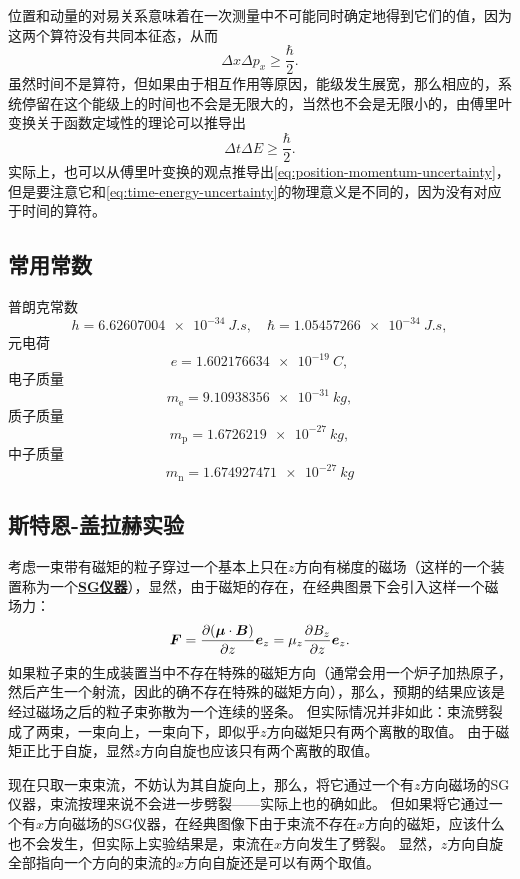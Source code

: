 \documentclass[UTF8, a4paper]{ctexart}
\newcommand*{\concept}[1]{\underline{\textbf{#1}}}
\begin{document}
位置和动量的对易关系意味着在一次测量中不可能同时确定地得到它们的值，因为这两个算符没有共同本征态，从而
\begin{equation}
    \Delta x \Delta p_x \geq \frac{\hbar}{2}.
    \label{eq:position-momentum-uncertainty}
\end{equation}
虽然时间不是算符，但如果由于相互作用等原因，能级发生展宽，那么相应的，系统停留在这个能级上的时间也不会是无限大的，当然也不会是无限小的，由傅里叶变换关于函数定域性的理论可以推导出
\begin{equation}
    \Delta t \Delta E \geq \frac{\hbar}{2}.
    \label{eq:time-energy-uncertainty}
\end{equation}
实际上，也可以从傅里叶变换的观点推导出\eqref{eq:position-momentum-uncertainty}，但是要注意它和\eqref{eq:time-energy-uncertainty}的物理意义是不同的，因为没有对应于时间的算符。

\subsection{常用常数}

普朗克常数
\[
    h = \SI{6.62607004e-34}{J.s}, \quad \hbar = \SI{1.05457266e-34}{J.s},
\]
元电荷
\[
    e = \SI{1.602176634e-19}{C},
\]
电子质量
\[
    m_\text{e} = \SI{9.10938356e-31}{kg},
\]
质子质量
\[
    m_\text{p} = \SI{1.6726219e-27}{kg},
\]
中子质量
\[
    m_\text{n} = \SI{1.674927471e-27}{kg}
\]

\subsection{斯特恩-盖拉赫实验}

考虑一束带有磁矩的粒子穿过一个基本上只在$z$方向有梯度的磁场（这样的一个装置称为一个\concept{SG仪器}），显然，由于磁矩的存在，在经典图景下会引入这样一个磁场力：
\begin{equation}
    \vb*{F} = \pdv{(\vb*{\mu} \cdot \vb*{B})}{z} \vb*{e}_z = \mu_z \pdv{B_z}{z} \vb*{e}_z.
\end{equation}
如果粒子束的生成装置当中不存在特殊的磁矩方向（通常会用一个炉子加热原子，然后产生一个射流，因此的确不存在特殊的磁矩方向），那么，预期的结果应该是经过磁场之后的粒子束弥散为一个连续的竖条。
但实际情况并非如此：束流劈裂成了两束，一束向上，一束向下，即似乎$z$方向磁矩只有两个离散的取值。
由于磁矩正比于自旋，显然$z$方向自旋也应该只有两个离散的取值。

现在只取一束束流，不妨认为其自旋向上，那么，将它通过一个有$z$方向磁场的SG仪器，束流按理来说不会进一步劈裂——实际上也的确如此。
但如果将它通过一个有$x$方向磁场的SG仪器，在经典图像下由于束流不存在$x$方向的磁矩，应该什么也不会发生，但实际上实验结果是，束流在$x$方向发生了劈裂。
显然，$z$方向自旋全部指向一个方向的束流的$x$方向自旋还是可以有两个取值。
\end{document}
